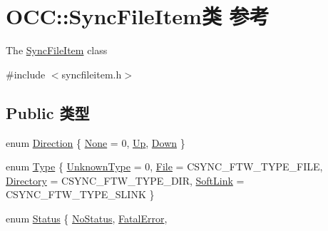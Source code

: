 \hypertarget{class_o_c_c_1_1_sync_file_item}{}\section{O\+CC\+:\+:Sync\+File\+Item类 参考}
\label{class_o_c_c_1_1_sync_file_item}


The \hyperlink{class_o_c_c_1_1_sync_file_item}{Sync\+File\+Item} class  




{\ttfamily \#include $<$syncfileitem.\+h$>$}

\subsection*{Public 类型}
\begin{DoxyCompactItemize}
\item 
enum \hyperlink{class_o_c_c_1_1_sync_file_item_ad6db6c9821da051d0c790fb50603922b}{Direction} \{ \hyperlink{class_o_c_c_1_1_sync_file_item_ad6db6c9821da051d0c790fb50603922bac484dd612f0c79c95f35ff8f6dd0e6d8}{None} = 0, 
\hyperlink{class_o_c_c_1_1_sync_file_item_ad6db6c9821da051d0c790fb50603922ba42097bff769b901e6e8d540d3b731b3d}{Up}, 
\hyperlink{class_o_c_c_1_1_sync_file_item_ad6db6c9821da051d0c790fb50603922ba00f5e7e5529e77cdfd86825235ae248d}{Down}
 \}
\item 
enum \hyperlink{class_o_c_c_1_1_sync_file_item_ae6dda85439b3566dc79a922c11dee754}{Type} \{ \hyperlink{class_o_c_c_1_1_sync_file_item_ae6dda85439b3566dc79a922c11dee754ab74ea4777cee75b62eda42d5a638190f}{Unknown\+Type} = 0, 
\hyperlink{class_o_c_c_1_1_sync_file_item_ae6dda85439b3566dc79a922c11dee754aef1b538c3435a4423d96d7f262368c6d}{File} = C\+S\+Y\+N\+C\+\_\+\+F\+T\+W\+\_\+\+T\+Y\+P\+E\+\_\+\+F\+I\+LE, 
\hyperlink{class_o_c_c_1_1_sync_file_item_ae6dda85439b3566dc79a922c11dee754a5b5d06e0f11e0244ef25e91bbabeae39}{Directory} = C\+S\+Y\+N\+C\+\_\+\+F\+T\+W\+\_\+\+T\+Y\+P\+E\+\_\+\+D\+IR, 
\hyperlink{class_o_c_c_1_1_sync_file_item_ae6dda85439b3566dc79a922c11dee754a6e94f40aae4b54f82d2b9510cd3ee220}{Soft\+Link} = C\+S\+Y\+N\+C\+\_\+\+F\+T\+W\+\_\+\+T\+Y\+P\+E\+\_\+\+S\+L\+I\+NK
 \}
\item 
enum \hyperlink{class_o_c_c_1_1_sync_file_item_a149ade86eddd9661587bfbc9bcbca408}{Status} \{ \newline
\hyperlink{class_o_c_c_1_1_sync_file_item_a149ade86eddd9661587bfbc9bcbca408a1eb4358635a761566dc0a905cc846c90}{No\+Status}, 
\hyperlink{class_o_c_c_1_1_sync_file_item_a149ade86eddd9661587bfbc9bcbca408a4886e3de3c84433c5fe34ce444fdb1ae}{Fatal\+Error}, 

\end{DoxyCompactItemize}

